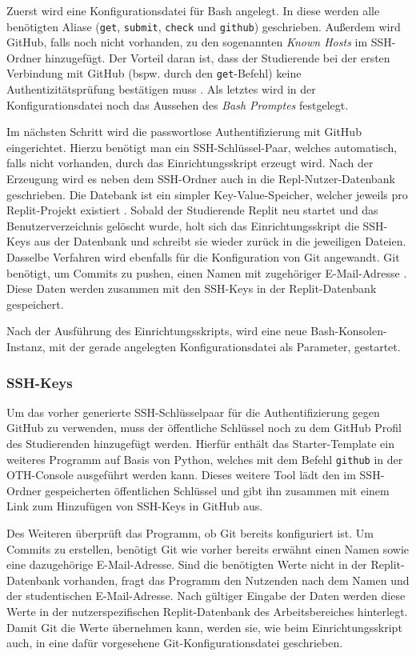 Zuerst wird eine Konfigurationsdatei für Bash angelegt. In diese werden alle
benötigten Aliase (\texttt{get}, \texttt{submit}, \texttt{check} und
\texttt{github}) geschrieben. Außerdem wird GitHub, falls noch nicht vorhanden,
zu den sogenannten \emph{Known Hosts} im SSH-Ordner hinzugefügt. Der Vorteil
daran ist, dass der Studierende bei der ersten Verbindung mit GitHub (bspw. durch
den \texttt{get}-Befehl) keine Authentizitätsprüfung bestätigen muss
\parencite{ssh}. Als letztes wird in der Konfigurationsdatei noch das Aussehen
des \emph{Bash Promptes} festgelegt.

Im nächsten Schritt wird die passwortlose Authentifizierung mit GitHub
eingerichtet. Hierzu benötigt man ein SSH-Schlüssel-Paar, welches automatisch,
falls nicht vorhanden, durch das Einrichtungsskript erzeugt wird. Nach der
Erzeugung wird es neben dem SSH-Ordner auch in die Repl-Nutzer-Datenbank
geschrieben. Die Datebank ist ein simpler Key-Value-Speicher, welcher jeweils
pro Replit-Projekt existiert \parencite{replit-database}. Sobald der Studierende
Replit neu startet und das Benutzerverzeichnis gelöscht wurde, holt sich das
Einrichtungsskript die SSH-Keys aus der Datenbank und schreibt sie wieder
zurück in die jeweiligen Dateien. Dasselbe Verfahren wird ebenfalls für die
Konfiguration von Git angewandt. Git benötigt, um Commits zu pushen, einen 
Namen mit zugehöriger E-Mail-Adresse \parencite{git-config}. Diese Daten werden
zusammen mit den SSH-Keys in der Replit-Datenbank gespeichert.

Nach der Ausführung des Einrichtungsskripts, wird eine neue
Bash-Konsolen-Instanz, mit der gerade angelegten Konfigurationsdatei als
Parameter, gestartet.

\subsubsection{SSH-Keys}\label{replit-template-ssh-keys}
Um das vorher generierte SSH-Schlüsselpaar für die Authentifizierung gegen
GitHub zu verwenden, muss der öffentliche Schlüssel noch zu dem GitHub Profil
des Studierenden hinzugefügt werden. Hierfür enthält das Starter-Template ein
weiteres Programm auf Basis von Python, welches mit dem Befehl \texttt{github}
in der OTH-Console ausgeführt werden kann. Dieses weitere Tool lädt den im
SSH-Ordner gespeicherten öffentlichen Schlüssel und gibt ihn zusammen mit einem
Link zum Hinzufügen von SSH-Keys in GitHub aus.

Des Weiteren überprüft das Programm, ob Git bereits konfiguriert ist. Um Commits
zu erstellen, benötigt Git wie vorher bereits erwähnt einen Namen sowie eine
dazugehörige E-Mail-Adresse. Sind die benötigten Werte nicht in der
Replit-Datenbank vorhanden, fragt das Programm den Nutzenden nach dem Namen und
der studentischen E-Mail-Adresse. Nach gültiger Eingabe der Daten werden diese
Werte in der nutzerspezifischen Replit-Datenbank des Arbeitsbereiches
hinterlegt. Damit Git die Werte übernehmen kann, werden sie, wie beim
Einrichtungsskript auch, in eine dafür vorgesehene Git-Konfigurationsdatei
geschrieben.